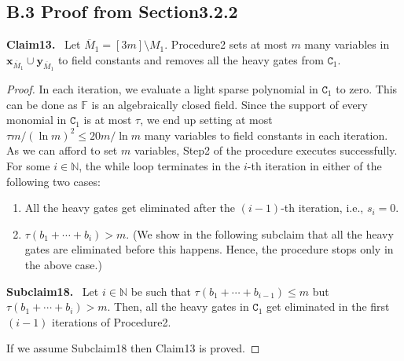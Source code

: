 \documentclass[10pt,a4paper]{article}
\newenvironment{authorclaim}[1]{\par\medskip\noindent\textbf{#1.}\ \ignorespaces}{\par\medskip}
\begin{document}
\subsection*{B.3 Proof from Section3.2.2}
\begin{authorclaim}{Claim13}
Let $\overline M_1=[3m]\setminus M_1$. Procedure2 sets at most $m$ many variables in $\mathbf x_{\overline M_1}\cup\mathbf y_{\overline M_1}$ to field constants and removes all the heavy gates from $\mathtt C_1$.
\end{authorclaim}
\begin{proof}
In each iteration, we evaluate a light sparse polynomial in $\mathtt C_1$ to zero. This can be done as $\mathbb F$ is an algebraically closed field. Since the support of every monomial in $\mathtt C_1$ is at most $\tau$, we end up setting at most $\tau m/(\ln m)^2\le20m/\ln m$ many variables to field constants in each iteration. As we can afford to set $m$ variables, Step2 of the procedure executes successfully. For some $i\in\mathbb N$, the while loop terminates in the $i$-th iteration in either of the following two cases:
\begin{enumerate}
\item All the heavy gates get eliminated after the $(i-1)$-th iteration, i.e., $s_i=0$.
\item $\tau(b_1+\cdots+b_i)>m$. (We show in the following subclaim that all the heavy gates are eliminated before this happens. Hence, the procedure stops only in the above case.)
\end{enumerate}
\begin{authorclaim}{Subclaim18}
Let $i\in\mathbb N$ be such that $\tau(b_1+\cdots+b_{i-1})\le m$ but $\tau(b_1+\cdots+b_i)>m$. Then, all the heavy gates in $\mathtt C_1$ get eliminated in the first $(i-1)$ iterations of Procedure2.
\end{authorclaim}
If we assume Subclaim18 then Claim13 is proved.
\end{proof}
\end{document}
